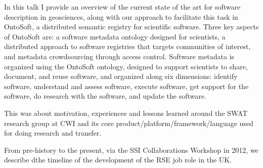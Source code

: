 \documentclass[a4paper,UKenglish]{dagrep}
\begin{document}



In this talk I provide an overview of the current state of the art for software description in geosciences, along with our approach to facilitate this task in OntoSoft, a distributed semantic registry for scientific software. Three key aspects of OntoSoft are: a software metadata ontology designed for scientists, a distributed approach to software registries that targets communities of interest, and metadata crowdsourcing through access control. Software metadata is organized using the OntoSoft ontology, designed to support scientists to share, document, and reuse software, and organized along six dimensions: identify software, understand and assess software, execute software, get support for the software, do research with the software, and update the software.


This was about motivation, experiences and lessons learned around the SWAT research group at CWI and its core product/platform/framework/language used for doing research and transfer. 






From pre-history to the present, via the SSI Collaborations Workshop in 2012, we describe dthe timeline of the development of the RSE job role in the UK.
\end{document}

